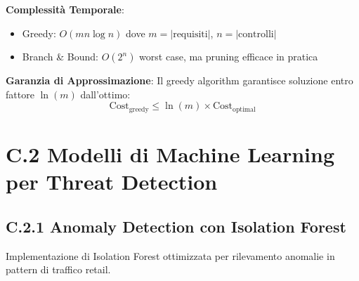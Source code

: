 \textbf{Complessità Temporale}:
\begin{itemize}
    \item Greedy: $O(mn \log n)$ dove $m = |\text{requisiti}|$, $n = |\text{controlli}|$
    \item Branch \& Bound: $O(2^n)$ worst case, ma pruning efficace in pratica
\end{itemize}

\textbf{Garanzia di Approssimazione}:
Il greedy algorithm garantisce soluzione entro fattore $\ln(m)$ dall'ottimo:
\begin{equation}
\text{Cost}_{\text{greedy}} \leq \ln(m) \times \text{Cost}_{\text{optimal}}
\end{equation}

\section{C.2 Modelli di Machine Learning per Threat Detection}

\subsection{C.2.1 Anomaly Detection con Isolation Forest}

Implementazione di Isolation Forest ottimizzata per rilevamento anomalie in pattern di traffico retail.

